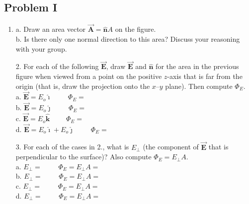 \documentclass{article}
\newcommand{\ihat}[0]{\hat{\boldsymbol{\imath}}}
\newcommand{\jhat}[0]{\hat{\boldsymbol{\jmath}}}
\newcommand{\khat}[0]{\hat{\boldsymbol{k}}}
\newcommand{\bfvec}[1]{\vec{\mathbf{#1}}}
\begin{document}
\subsection{Problem I}



\begin{enumerate}

  \item a. Draw an area vector $\bfvec{A}=\hat{\mathbf{n}}A$ on the figure.\\

        b. Is there only one normal direction to this area? Discuss your reasoning with your group.

\end{enumerate}

\begin{enumerate}

  \item[2.] For each of the following $\bfvec{E}$, draw  $\bfvec{E}$ and $\hat{\mathbf{n}}$ for the area in the previous figure when viewed from a point on the positive $z$-axis that is far from the origin (that is, draw the projection onto the $x$--$y$ plane). Then compute $\Phi_E$.\\

            a. $\bfvec{E}=E_o\ihat\qquad$ $\Phi_E=$\\

            b. $\bfvec{E}=E_o\jhat\qquad$ $\Phi_E=$\\

            c. $\bfvec{E}=E_o\khat\qquad$ $\Phi_E=$\\

            d. $\bfvec{E}=E_o\ihat + E_o\jhat\qquad$ $\Phi_E=$

\end{enumerate}

\begin{enumerate}

  \item[3.] For each of the cases in 2., what is $E_{\perp}$ (the component of $\bfvec{E}$ that is perpendicular to the surface)? Also compute $\Phi_E=E_{\perp}A$.\\

            a. $E_{\perp}=\qquad$ $\Phi_E=E_{\perp}A=$\\

            b. $E_{\perp}=\qquad$ $\Phi_E=E_{\perp}A=$\\

            c. $E_{\perp}=\qquad$ $\Phi_E=E_{\perp}A=$\\

            d. $E_{\perp}=\qquad$ $\Phi_E=E_{\perp}A=$

\end{enumerate}
\end{document}
